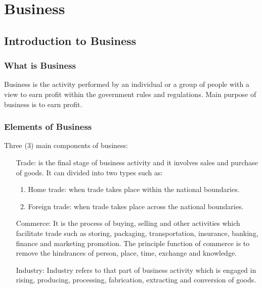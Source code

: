\documentclass[11pt]{book}
\begin{document}
\part{Business}

\chapter{Introduction to Business}


\section{What is Business}
Business is the activity performed by an individual or a group of people with a view to earn profit within the government rules and regulations. Main purpose of business is to earn profit.

\section{Elements of Business}
Three ($3$) main components of business:
\begin{enumerate}
	\item[Trade:] is the final stage of business activity and it involves sales and purchase of goods. It can divided into two types such as:
		\begin{enumerate}
			\item Home trade: when trade takes place within the national boundaries.
			\item Foreign trade: when trade takes place across the national boundaries.
		\end{enumerate}
	\item[Commerce:] It is the process of buying, selling and other activities which facilitate trade such as storing, packaging, transportation, insurance, banking, finance and marketing promotion. The principle function of commerce is to remove the hindrances of person, place, time, exchange and knowledge.
	\item[Industry:] Industry refers to that part of business activity which is engaged in rising, producing, processing, fabrication, extracting and conversion of goods.
\end{enumerate}
\end{document}
